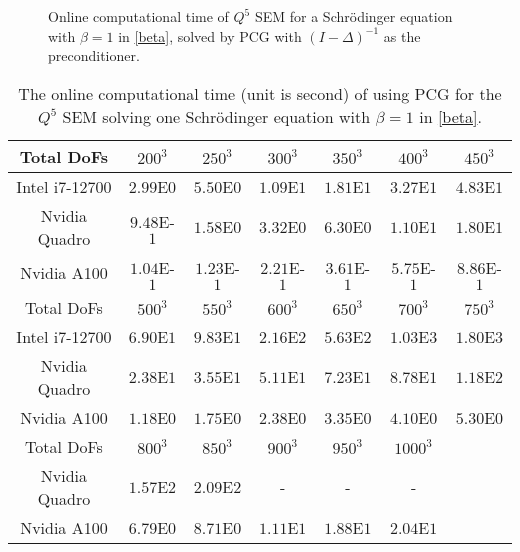 \documentclass{article}
\begin{document}
\begin{figure}[!ht]
\caption{Online computational time of $Q^5$ SEM for a Schr{\"o}dinger equation with $\beta=1$ in \eqref{beta}, solved by PCG with $(I - \Delta)^{-1}$ as the preconditioner.}
	\label{fig1:schrodinger_cpu_gpu}
 \end{figure}


 
\begin{table}[ht!]
    \centering
    \begin{tabular}{|c|c|c|c|c|c|c|}
    \hline
         Total DoFs  & $200^3$ & $250^3$ & $300^3$ & $350^3$ & $400^3$ & $450^3$\\
    \hline
         Intel i7-12700 & $2.99$E$0$ & $5.50$E$0$ & $1.09$E$1$ & $1.81$E$1$ & $3.27$E$1$ & $4.83$E$1$\\
    \hline
         Nvidia Quadro & $9.48$E-$1$ & $1.58$E$0$ & $3.32$E$0$ & $6.30$E$0$ & $1.10$E$1$ & $1.80$E$1$\\
    \hline
         Nvidia A100    & $1.04$E-$1$ & $1.23$E-$1$ & $2.21$E-$1$ & $3.61$E-$1$ & $5.75$E-$1$ & $8.86$E-$1$\\
    \hline
    \hline
         Total DoFs & $500^3$ & $550^3$ & $600^3$ & $650^3$ & $700^3$ & $750^3$\\
    \hline
         Intel i7-12700 & $6.90$E$1$ & $9.83$E$1$ & $2.16$E$2$ & $5.63$E$2$ & $1.03$E$3$ & $1.80$E$3$\\
    \hline
         Nvidia Quadro & $2.38$E$1$ & $3.55$E$1$ & $5.11$E$1$ & $7.23$E$1$ & $8.78$E$1$ & $1.18$E$2$\\
    \hline
         Nvidia A100 & $1.18$E$0$ & $1.75$E$0$ & $2.38$E$0$ & $3.35$E$0$ & $4.10$E$0$ & $5.30$E$0$\\
    \hline
    \hline
         Total DoFs & $800^3$ & $850^3$ & $900^3$ & $950^3$ & $1000^3$ & \\
    \hline
      Nvidia   Quadro & $1.57$E$2$ & $2.09$E$2$ & - & - & - & \\
    \hline
      Nvidia   A100 & $6.79$E$0$ & $8.71$E$0$ & $1.11$E$1$ & $1.88$E$1$ & $2.04$E$1$ & \\
    \hline
    \end{tabular}
    \caption{The online computational time (unit is second) of using PCG for the $Q^5$ SEM  solving one  Schr{\"o}dinger equation with $\beta=1$ in \eqref{beta}.}
    \label{tab5: schrodinger_CPU_GPU_beta1}
\end{table}
\end{document}
